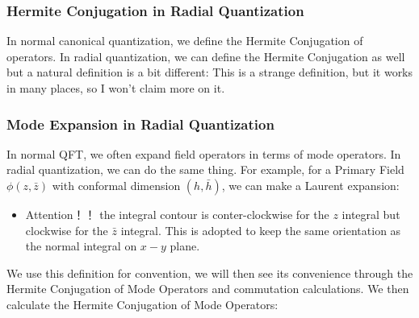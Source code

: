 \subsubsection{Hermite Conjugation in Radial
Quantization}\label{sec:Hermite Conjugation in Radial Quantization}

In normal canonical quantization, we define the Hermite Conjugation
of operators. In radial quantization, we can define the Hermite
Conjugation as well but a natural definition is a bit different:
This is a strange definition, but it works in many places, so I won't
claim more on it. 

\subsubsection{Mode Expansion in Radial Quantization}

In normal QFT, we often expand field operators in terms of mode
operators. In radial quantization, we can do the same thing. For
example, for a Primary Field $ \phi(z,\bar{z}) $ with conformal
dimension $ (h,\bar{h}) $, we can make a Laurent expansion:
\begin{itemize}
  \item Attention！！ the integral contour is conter-clockwise for the
    $ z $ integral but clockwise for the $ \bar{z} $ integral. This
    is adopted to keep the same orientation as the normal integral on
    $ x-y $ plane.
\end{itemize}
We use this definition for convention, we will then see its
convenience through the Hermite Conjugation of Mode Operators and
commutation calculations. We then calculate the Hermite Conjugation
of Mode Operators:

